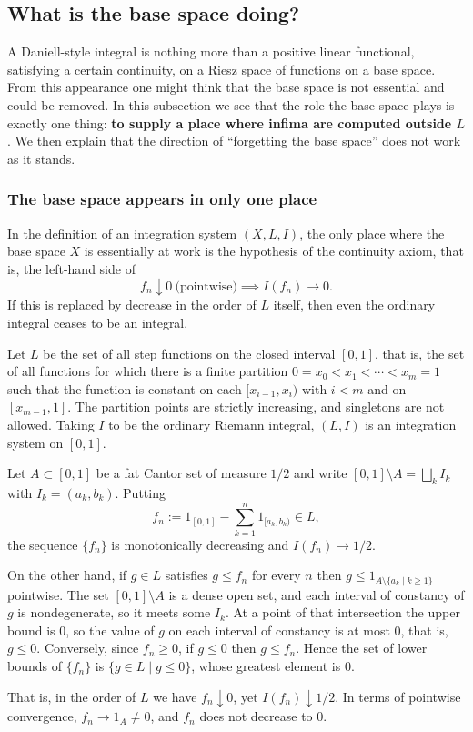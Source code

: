 \subsection{What is the base space doing?}\label{sec:forget}

A Daniell-style integral is nothing more than a positive linear functional,
satisfying a certain continuity, on a Riesz space of functions on a base space.
From this appearance one might think that the base space is not essential and
could be removed.
In this subsection we see that the role the base space plays is exactly one
thing: \textbf{to supply a place where infima are computed outside $L$}.
We then explain that the direction of ``forgetting the base space'' does not
work as it stands.

\subsubsection{The base space appears in only one place}

In the definition of an integration system $(X,L,I)$, the only place where the
base space $X$ is essentially at work is the hypothesis of the continuity axiom,
that is, the left-hand side of
\[
  f_n\downarrow0\ \text{(pointwise)}\implies I(f_n)\to0 .
\]
If this is replaced by decrease in the order of $L$ itself, then even the
ordinary integral ceases to be an integral.

\begin{example}\label{ex:fat-cantor}
  Let $L$ be the set of all step functions on the closed interval $[0,1]$, that
  is, the set of all functions for which there is a finite partition
  $0=x_0<x_1<\cdots<x_m=1$ such that the function is constant on each
  $[x_{i-1},x_i)$ with $i<m$ and on $[x_{m-1},1]$.
  The partition points are strictly increasing, and singletons are not allowed.
  Taking $I$ to be the ordinary Riemann integral, $(L,I)$ is an integration
  system on $[0,1]$.

  Let $A\subset[0,1]$ be a fat Cantor set of measure $1/2$ and write
  $[0,1]\setminus A=\bigsqcup_kI_k$ with $I_k=(a_k,b_k)$.
  Putting
  \[
    f_n:=1_{[0,1]}-\sum_{k=1}^n1_{[a_k,b_k)}\in L ,
  \]
  the sequence $\{f_n\}$ is monotonically decreasing and $I(f_n)\to1/2$.

  On the other hand, if $g\in L$ satisfies $g\le f_n$ for every $n$ then
  $g\le1_{A\setminus\{a_k\mid k\ge1\}}$ pointwise.
  The set $[0,1]\setminus A$ is a dense open set, and each interval of
  constancy of $g$ is nondegenerate, so it meets some $I_k$.
  At a point of that intersection the upper bound is $0$, so the value of $g$ on
  each interval of constancy is at most $0$, that is, $g\le0$.
  Conversely, since $f_n\ge0$, if $g\le0$ then $g\le f_n$.
  Hence the set of lower bounds of $\{f_n\}$ is $\{g\in L\mid g\le0\}$, whose
  greatest element is $0$.

  That is, in the order of $L$ we have $f_n\downarrow0$, yet
  $I(f_n)\downarrow1/2$.
  In terms of pointwise convergence, $f_n\to1_A\ne0$, and $f_n$ does not
  decrease to $0$.
\end{example}

